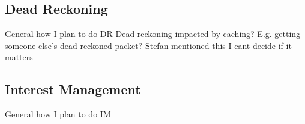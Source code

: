 \subsection*{Dead Reckoning}\label{sec:des:dr}
General how I plan to do DR 
Dead reckoning impacted by caching? E.g. getting someone else's dead reckoned packet? Stefan mentioned this I cant decide if it matters


\subsection*{Interest Management}\label{sec:des:im}
General how I plan to do IM 
